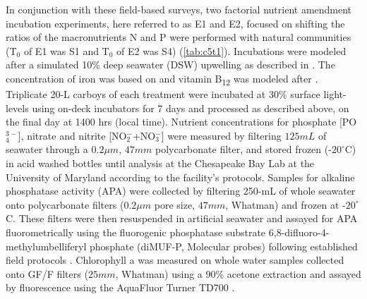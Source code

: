 In conjunction with these field-based surveys, two factorial nutrient amendment incubation experiments, here referred to as E1 and E2, focused on shifting the ratios of the macronutrients N and P were performed with natural communities (T$_0$ of E1 was S1 and T$_0$ of E2 was S4) (\cref{tab:c5t1}). Incubations were modeled after a simulated 10\% deep seawater (DSW) upwelling as described in \citet{Alexander2015a}. The concentration of iron was based on \citet{Marchetti2012a} and vitamin B\textsubscript{12} was modeled after \citet{Bertrand2007}. Triplicate 20-L carboys of each treatment were incubated at 30\% surface light-levels using on-deck incubators for 7 days and processed as described above, on the final day at 1400 hrs (local time). Nutrient concentrations for phosphate [PO$_{4}^{3-}$], nitrate and nitrite [NO$_2^-$+NO$_3^-$] were measured by filtering $125 mL$ of seawater through a $0.2 \mu m$, $47 mm$ polycarbonate filter, and stored frozen (-$20^\circ$C) in acid washed bottles until analysis at the Chesapeake Bay Lab at the University of Maryland according to the facility's protocols. Samples for alkaline phosphatase activity (APA) were collected by filtering 250-mL of whole seawater onto polycarbonate filters ($0.2 \mu m$ pore size, $47 mm$, Whatman) and frozen at -$20^\circ$C. These filters were then resuspended in artificial seawater and assayed for APA fluorometrically using the fluorogenic phosphatase substrate 6,8-difluoro-4-methylumbelliferyl phosphate (diMUF-P, Molecular probes) following established field protocols \citep{Dyhrman2006}. Chlorophyll a was measured on whole water samples collected onto GF/F filters ($25 mm$, Whatman) using a 90\% acetone extraction and assayed by fluorescence using the AquaFluor Turner TD700 \citep{Parsons1984}.\par


